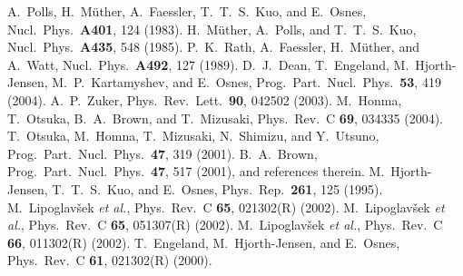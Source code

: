 \documentclass[prc,aps,amsmath,amssymb,preprintnumbers,showpacs,twocolumn]{revtex4}
\begin{document}
\begin{thebibliography}{99}
A.\ Polls, H.\ M\"{u}ther, A.\ Faessler,
T.~T.~S.\ Kuo, and E.\ Osnes, Nucl.\ Phys.\
 {\bf A401}, 124  (1983).
 H.\ M\"{u}ther, A.\ Polls, and T.~T.~S.\ Kuo, 
Nucl.~Phys.~{\bf A435}, 548 (1985).
 P.~K.~Rath, A.~Faessler, H.~M\"uther, and A.~Watt,
Nucl.~Phys.~{\bf A492}, 127 (1989).
 D.~J.~Dean, T.~Engeland, M.~Hjorth-Jensen, M.~P.~Kartamyshev,
and E.~Osnes, Prog.~Part.~Nucl.~Phys.~{\bf 53}, 419 (2004).
 A.~P.~Zuker, Phys.~Rev.~Lett.~{\bf 90}, 042502 (2003).
\bibitem{taka1} M.~Honma, T.~Otsuka, B.~A.~Brown, and T.~Mizusaki, Phys.~Rev.~C
{\bf 69}, 034335 (2004).
 T.~Otsuka, M.~Homna, T.~Mizusaki, N.~Shimizu, and Y.~Utsuno,
Prog.~Part.~Nucl.~Phys.~{\bf 47}, 319  (2001).  %
 B.~A.~Brown, 
Prog.~Part.~Nucl.~Phys.~{\bf 47}, 517  (2001),  %
and references therein.
 M.~Hjorth-Jensen, T.~T.~S.~Kuo, and E.~Osnes,
Phys.~Rep.~{\bf 261}, 125 (1995).
M.~Lipoglav\v{s}ek {\it et al.}, Phys.~Rev.~C {\bf 65}, 
021302(R) (2002).
M.~Lipoglav\v{s}ek {\it et al.}, Phys.~Rev.~C {\bf 65}, 
051307(R) (2002).
M.~Lipoglav\v{s}ek {\it et al.}, Phys.~Rev.~C {\bf 66}, 
011302(R) (2002).
T.~Engeland, M.~Hjorth-Jensen, and E.~Osnes,
    Phys.~Rev.~C {\bf 61}, 021302(R) (2000).


\end{thebibliography}
\end{document}
